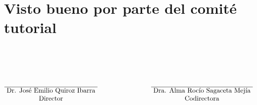 \newpage
\section {Visto bueno por parte del comité tutorial}
\[\begin{matrix}\centering
&&\\&&\\&&\\&&\\&&\\
\overline{\text{ Dr. José Emilio Quiroz Ibarra }}&\qquad\qquad\qquad&\overline{\text{ Dra. Alma Rocío Sagaceta Mejía }}\\
\text{Director}&&\text{Codirectora}
\end{matrix}\]